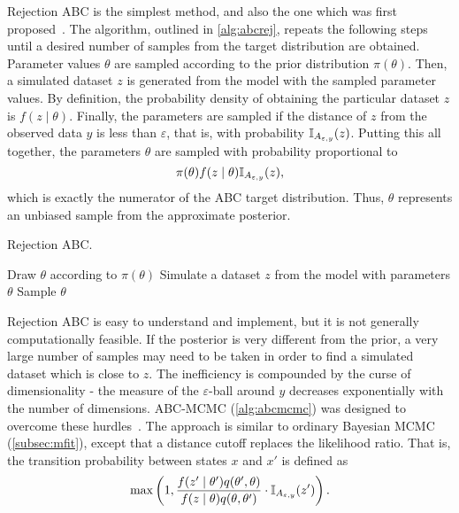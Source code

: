 Rejection ABC is the simplest method, and also the one which was first
proposed~\autocite{rubin1984bayesianly, tavare1997inferring}. The algorithm,
outlined in \cref{alg:abcrej}, repeats the following steps until a desired
number of samples from the target distribution are obtained. Parameter values
$\theta$ are sampled according to the prior distribution $\pi(\theta)$. Then, a
simulated dataset $z$ is generated from the model with the sampled parameter
values. By definition, the probability density of obtaining the particular
dataset $z$ is $f(z \mid \theta)$. Finally, the parameters are sampled if the
distance of $z$ from the observed data $y$ is less than $\varepsilon$, that is,
with probability $\mathbb{I}_{A_{\varepsilon, y}}(z)$. Putting this all together, the
parameters $\theta$ are sampled with probability proportional to
\[
  \pi(\theta) f(z \mid \theta) \mathbb{I}_{A_{\varepsilon, y}}(z),
\]
which is exactly the numerator of the \gls{ABC} target distribution. Thus,
$\theta$ represents an unbiased sample from the approximate posterior.

\begin{algorithm}
  \caption{Rejection \gls{ABC}.}
  \begin{algorithmic}
    \Loop
      \State Draw $\theta$ according to $\pi(\theta)$
      \State Simulate a dataset $z$ from the model with parameters $\theta$
        \State Sample $\theta$
      \EndIf
    \EndLoop
  \end{algorithmic}
  \label{alg:abcrej}
\end{algorithm}

Rejection \gls{ABC} is easy to understand and implement, but it is not
generally computationally feasible. If the posterior is very different from the
prior, a very large number of samples may need to be taken in order to find a
simulated dataset which is close to $z$. The inefficiency is compounded
by the curse of dimensionality - the measure of the $\varepsilon$-ball around
$y$ decreases exponentially with the number of dimensions.
\gls{ABC}-\gls{MCMC} (\cref{alg:abcmcmc}) was designed to overcome these
hurdles~\autocite{marjoram2003markov}. The approach is similar to ordinary
Bayesian \gls{MCMC} (\cref{subsec:mfit}), except that a distance cutoff
replaces the likelihood ratio. That is, the transition probability between
states $x$ and $x'$ is defined as
\[
  \max\left(1, \frac{f(z' \mid \theta') q(\theta', \theta)}
                    {f(z \mid \theta) q(\theta, \theta')} 
    \cdot \mathbb{I}_{A_{\varepsilon, y}}(z') \right).
\]

